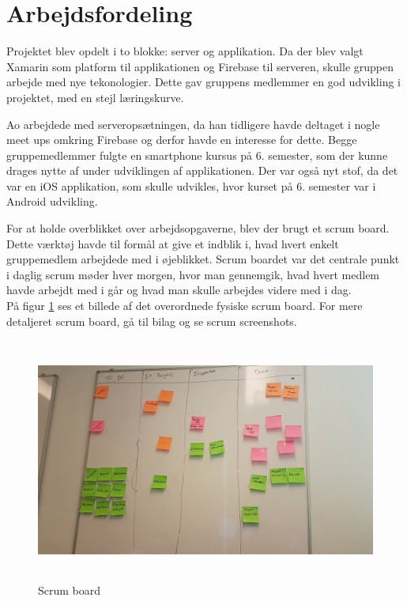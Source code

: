 \section{Arbejdsfordeling}
Projektet blev opdelt i to blokke: server og applikation. Da der blev valgt Xamarin som platform til applikationen og Firebase til serveren, skulle gruppen arbejde med nye tekonologier. Dette gav gruppens medlemmer en god udvikling i projektet, med en stejl læringskurve.

Ao arbejdede med serveropsætningen, da han tidligere havde deltaget i nogle meet ups omkring Firebase og derfor havde en interesse for dette. Begge gruppemedlemmer fulgte en smartphone kursus på 6. semester, som der kunne drages nytte af under udviklingen af applikationen. Der var også nyt stof, da det var en iOS applikation, som skulle udvikles, hvor kurset på 6. semester var i Android udvikling. \\

\clearpage

For at holde overblikket over arbejdsopgaverne, blev der brugt et scrum board. Dette værktøj havde til formål at give et indblik i, hvad hvert enkelt gruppemedlem arbejdede med i øjeblikket. Scrum boardet var det centrale punkt i daglig scrum møder hver morgen, hvor man gennemgik, hvad hvert medlem havde arbejdt med i går og hvad man skulle arbejdes videre med i dag. \\
På figur \ref{fig:Scrumboard} ses et billede af det overordnede fysiske scrum board. For mere detaljeret scrum board, gå til bilag og se scrum screenshots. \\

\begin{figure} [H]
	\begin{center}
		\includegraphics[height=8cm, width=12cm]{Arbejdsfordeling/ScrumBoard}
	\end{center}
	\caption{Scrum board}
	\label{fig:Scrumboard}
\end{figure}


\clearpage